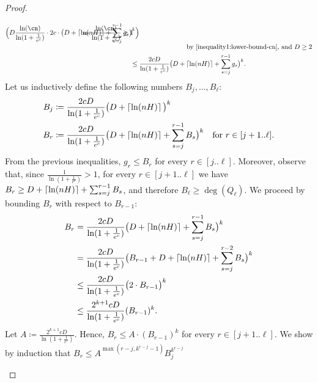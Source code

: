 \begin{proof}
\begin{claimproof}
\begin{align*}
            \Big(D \frac{\ln(\cn)}{\ln(1 + \frac{1}{e^c})} 
            \cdot 2 c \cdot \big(D + \ceil{\ln(n H)} 
            + \sum_{s=j}^{r-1} g_s \big)^k \Big)
          &
          \hspace{-3cm}
          \text{as $\frac{\ln(\cn)}{\ln(1 + \frac{1}{e^c})} \geq 1$}\\[-5pt]
          &&
          \hspace{-3.5cm}
          \text{by~\eqref{inequality1:lower-bound-cn}, and $D \geq 2$}
          \\
          \leq{}& \frac{2cD}{\ln(1 + \frac{1}{e^c})} 
            \big(D + \ceil{\ln(n H)} + \sum_{s=j}^{r-1} g_s \big)^k.
        \end{align*}
          Let us inductively define the following numbers $B_j,\dots,B_\ell$:
          \begin{align*} 
            B_j &\coloneqq 
              \frac{2cD}{\ln(1 + \frac{1}{e^c})} 
              \big(D + \left\lceil\ln(n H)\right\rceil \big)^k\\
            B_r &\coloneqq 
              \frac{2cD}{\ln(1 + \frac{1}{e^c})} 
              \big(D + \left\lceil\ln(n H)\right\rceil + \sum_{s=j}^{r-1} B_s \big)^k
            &\text{for } r \in [j+1..\ell].
          \end{align*}
          From the previous inequalities, $g_r \leq B_r$ for every $r \in [j..\ell]$.
          Moreover, observe that, since $\frac{1}{\ln(1+\frac{1}{e^c})} > 1$,  
          for every $r \in [j+1..\ell]$ we have $B_r \geq D + \left\lceil\ln(n H)\right\rceil + \sum_{s=j}^{r-1} B_s$, and therefore $B_\ell \geq \deg(Q_\ell)$.
          We proceed by bounding $B_r$ with respect to 
          $B_{r-1}$:
          \begin{align*}
              B_r & = \frac{2cD}{\ln(1 + \frac{1}{e^c})} 
                \big(D + \left\lceil\ln(n H)\right\rceil + \sum_{s=j}^{r-1} B_s \big)^k
              \\
              & = \frac{2cD}{\ln(1 + \frac{1}{e^c})} 
                \big(B_{r-1} + D + \left\lceil\ln(n H)\right\rceil + \sum_{s=j}^{r-2} B_s \big)^k\\
              &\leq \frac{2cD}{\ln(1 + \frac{1}{e^c})} \big(2 \cdot B_{r-1} \big)^k\\
              &\leq \frac{2^{k+1}cD}{\ln(1 + \frac{1}{e^c})}(B_{r-1})^k.
          \end{align*}
          Let $A \coloneqq \frac{2^{k+1}cD}{\ln(1 + \frac{1}{e^c})}$. 
          Hence, $B_r \leq A \cdot (B_{r-1})^k$ for every $r \in [j+1..\ell]$.
          We show by induction that $B_r \leq A^{\max(r-j,k^{r-j}-1)}B_j^{k^{r-j}}$

\end{claimproof}
\end{proof}
